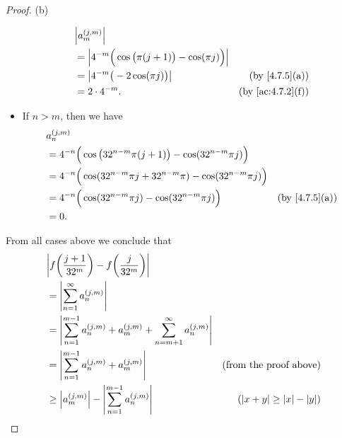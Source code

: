 \begin{proof}{(b)}
\begin{itemize}
          \begin{align*}
             & \abs{a_m^{(j, m)}}                                                                                \\
             & = \abs{4^{-m} \Big(\cos\big(\pi (j + 1)\big) - \cos(\pi j)\Big)}                                  \\
             & = \abs{4^{-m} \big(-2 \cos(\pi j)\big)}                          & \text{(by \cref{4.7.5}(a))}    \\
             & = 2 \cdot 4^{-m}.                                                & \text{(by \cref{ac:4.7.2}(f))}
          \end{align*}
    \item If \(n > m\), then we have
          \begin{align*}
             & a_n^{(j, m)}                                                                                                      \\
             & = 4^{-n} \Big(\cos\big(32^{n - m} \pi (j + 1)\big) - \cos(32^{n - m} \pi j)\Big)                                  \\
             & = 4^{-n} \Big(\cos(32^{n - m} \pi j + 32^{n - m} \pi) - \cos(32^{n - m} \pi j)\Big)                               \\
             & = 4^{-n} \Big(\cos(32^{n - m} \pi j) - \cos(32^{n - m} \pi j)\Big)                  & \text{(by \cref{4.7.5}(a))} \\
             & = 0.
          \end{align*}
  \end{itemize}
  From all cases above we conclude that
  \begin{align*}
     & \abs{f\bigg(\frac{j + 1}{32^m}\bigg) - f\bigg(\frac{j}{32^m}\bigg)}                                                                    \\
     & = \abs{\sum_{n = 1}^\infty a_n^{(j, m)}}                                                                                               \\
     & = \abs{\sum_{n = 1}^{m - 1} a_n^{(j, m)} + a_m^{(j, m)} + \sum_{n = m + 1}^\infty a_n^{(j, m)}}                                        \\
     & = \abs{\sum_{n = 1}^{m - 1} a_n^{(j, m)} + a_m^{(j, m)}}                                        & \text{(from the proof above)}        \\
     & \geq \abs{a_m^{(j, m)}} - \abs{\sum_{n = 1}^{m - 1} a_n^{(j, m)}}                               & (\abs{x + y} \geq \abs{x} - \abs{y}) \\

\end{align*}
\end{proof}
